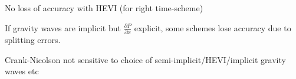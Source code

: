 \begin{slide}

\begin{list0}
    \item No loss of accuracy with HEVI (for right time-scheme)

    \item If gravity waves are implicit but $\frac{\partial P}{\partial x}$ explicit, some schemes lose accuracy due to splitting errors.
    
    \item Crank-Nicolson not sensitive to choice of semi-implicit/HEVI/implicit gravity waves etc

\end{list0}


\end{slide}

